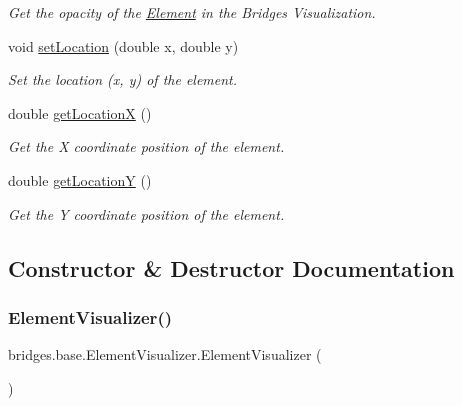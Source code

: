 \begin{DoxyCompactItemize}
\begin{DoxyCompactList}\small\item\em Get the opacity of the \mbox{\hyperlink{classbridges_1_1base_1_1_element}{Element}} in the Bridges Visualization. \end{DoxyCompactList}\item 
void \mbox{\hyperlink{classbridges_1_1base_1_1_element_visualizer_a04f3416447f2042de7cd21ce5b6a0598}{set\+Location}} (double x, double y)
\begin{DoxyCompactList}\small\item\em Set the location (x, y) of the element. \end{DoxyCompactList}\item 
double \mbox{\hyperlink{classbridges_1_1base_1_1_element_visualizer_aec8d0e757d323ff6122a2e05ab89f852}{get\+LocationX}} ()
\begin{DoxyCompactList}\small\item\em Get the X coordinate position of the element. \end{DoxyCompactList}\item 
double \mbox{\hyperlink{classbridges_1_1base_1_1_element_visualizer_ac170e945106f43cac3a3bdd950c60235}{get\+LocationY}} ()
\begin{DoxyCompactList}\small\item\em Get the Y coordinate position of the element. \end{DoxyCompactList}\end{DoxyCompactItemize}


\subsection{Constructor \& Destructor Documentation}
\mbox{\label{classbridges_1_1base_1_1_element_visualizer_acbca874876ec1e8dbbde6484a4fc056e}} 
\subsubsection{\texorpdfstring{Element\+Visualizer()}{ElementVisualizer()}\hspace{0.1cm}{\footnotesize\ttfamily [1/6]}}
{\footnotesize\ttfamily bridges.\+base.\+Element\+Visualizer.\+Element\+Visualizer (\begin{DoxyParamCaption}{ }\end{DoxyParamCaption})}

